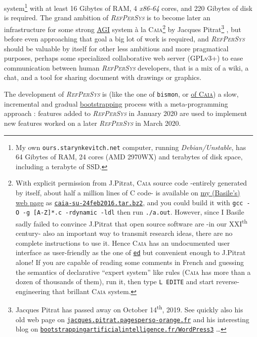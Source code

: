 \documentclass[11pt,a4paper,svgnames]{techreport}
\newcommand{\RefPerSys}{{\textit{\textsc{RefPerSys}}}}
\begin{document}
system\footnote{My own \texttt{ours.starynkevitch.net} computer,
running \textit{Debian/Unstable}, has 64 Gibytes of RAM, 24 cores (AMD
2970WX) and terabytes of disk space, including a terabyte of SSD.}
with at least 16 Gibytes of RAM, 4 \textit{x86-64} cores, and 220
Gibytes of disk is required. The grand ambition of {\RefPerSys} is to
become later an infrastructure for some strong
\href{https://en.wikipedia.org/wiki/Artificial_general_intelligence}{AGI}
system à la \textsc{Caia}\footnote{With explicit permission from
J.Pitrat, \textsc{Caia} source code -entirely generated by itself,
about half a million lines of C code- is available on \href{http://starynkevitch.net/Basile/}{my (Basile's) web page} as
\href{http://starynkevitch.net/Basile/caia-su-24feb2016.tar.bz2}{\texttt{caia-su-24feb2016.tar.bz2}},
and you could build it with \texttt{gcc -O -g [A-Z]*.c -rdynamic -ldl}
then run \texttt{./a.out}. However, since I Basile sadly failed to
convince J.Pitrat that open source software are -in our
XXI\textsuperscript{th} century- also an important way to transmit
research ideas, there are no complete instructions to use it. Hence
\textsc{Caia} has an undocumented user interface as user-friendly as
the one of \href{https://www.gnu.org/software/ed/}{\texttt{ed}} but
convenient enough to J.Pitrat alone! If you are capable of reading
some comments in French and guessing the semantics of declarative
``expert system'' like rules (\textsc{Caia} has more than a dozen of
thousands of them), run it, then type \texttt{L EDITE} and start
reverse-engineering that brillant \textsc{Caia} system.}  by Jacques
Pitrat\footnote{Jacques Pitrat has passed away on October
14\textsuperscript{th}, 2019. See quickly also his old web page on
\href{http://jacques.pitrat.pagesperso-orange.fr/}{\texttt{jacques.pitrat.pagesperso-orange.fr}}
and his interesting blog on
\href{http://bootstrappingartificialintelligence.fr/WordPress3/}{\texttt{bootstrappingartificialintelligence.fr/WordPress3}}
\ldots} \cite{Pitrat:1996:FGCS, Pitrat:2009:AST,
  Pitrat:2009:ArtifBeings}, but before even approaching that goal a
big lot of work is required, and {\RefPerSys} should be valuable by
itself for other less ambitious and more pragmatical purposes, perhaps
some specialized collaborative web server (GPLv3+) to ease
communication between human {\RefPerSys} developers, that is a mix of
a wiki, a chat, and a tool for sharing document with drawings or
graphics.

The development of {\RefPerSys} is (like the one of \texttt{bismon},
or
\href{http://bootstrappingartificialintelligence.fr/WordPress3/?s=CAIA}{of
  \textsc{Caia}}) a slow, incremental and gradual
\href{https://en.wikipedia.org/wiki/Bootstrapping}{bootstrapping}
process with a meta-programming \cite{dormoy:1992:meta} approach :
features added to {\RefPerSys} in January 2020 are used to implement
new features worked on a later {\RefPerSys} in March 2020.
\end{document}
